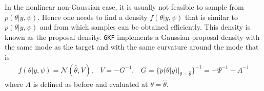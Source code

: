 \documentclass{article}
\newcommand{\GKF}{\texttt{GKF}\xspace}
\begin{document}
In the nonlinear non-Gaussian case, it is usually not feasible to sample from
$p(\theta|y,\psi)$. Hence one needs to find a density $f(\theta |y,\psi)$ that is similar to
$p(\theta|y,\psi)$ and from which samples can be obtained efficiently. This density is known
as the proposal density. \GKF implements a Gaussian proposal density with the same mode as
the target and with the same curvature around the mode that is
\begin{equation}
  \begin{array}{rcl}
    f(\theta|y,\psi)=\mathcal{N} (\hat{\theta},V), & V= -G^{-1}, & G = \{\ddot{p}(\theta|y)|_{\theta=\hat{\theta}} \}^{-1} = -\Psi^{-1} - A^{-1}
  \end{array}
  \label{eq:NewtonStepSample}
\end{equation}
where $A$ is defined as before and evaluated at $\theta=\hat{\theta}$.
\end{document}
